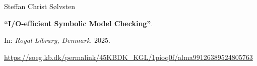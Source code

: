 Steffan Christ Sølvsten

{\bf ``I/O-efficient Symbolic Model Checking''}.

In: \emph{Royal Library, Denmark}.
2025.

\medskip

\url{https://soeg.kb.dk/permalink/45KBDK_KGL/1pioq0f/alma99126389524805763}

\label{cite:2025.thesis}